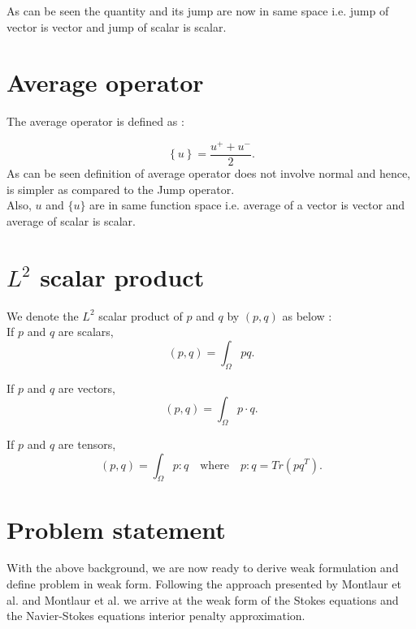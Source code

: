 \documentclass[a4paper,twoside,openright]{book}
\begin{document}
As can be seen the quantity and its jump are now in same space i.e. jump of vector is vector and jump of scalar is scalar.

\section{Average operator}

The average operator is defined as :

\begin{equation}\label{average operator}
\left\lbrace u \right\rbrace = \frac{u^+ + u^-}{2} \textrm{.}
\end{equation} 
\noindent
As can be seen definition of average operator does not involve normal and hence, is simpler as compared to the Jump operator.\\
Also, $u$ and $\lbrace u \rbrace$ are in same function space i.e. average of a vector is vector and average of scalar is scalar.\\

\section{$L^2$ scalar product}

We denote the $L^2$ scalar product of $p$ and $q$ by $(p,q)$ as below :\\

If $p$ and $q$ are scalars,
\begin{equation}\label{inner product scalars}
(p,q)=\int_{\Omega} pq \textrm{.}
\end{equation}

If $p$ and $q$ are vectors,
\begin{equation}\label{Inner product vectors}
(p,q)=\int_{\Omega} p \cdot q \textrm{.}
\end{equation}

If $p$ and $q$ are tensors,
\begin{equation}\label{Inner product tensors}
(p,q)=\int_{\Omega} p : q \quad \textrm{where} \quad p:q = Tr(pq^T) \textrm{.}
\end{equation}

\section{Problem statement}

With the above background, we are now ready to derive weak formulation and define problem in weak form. Following the approach presented by Montlaur et al. \cite{Montlaur} and Montlaur et al. \cite{Montlaur2} we arrive at the weak form of the Stokes equations and the Navier-Stokes equations interior penalty approximation.
\end{document}
